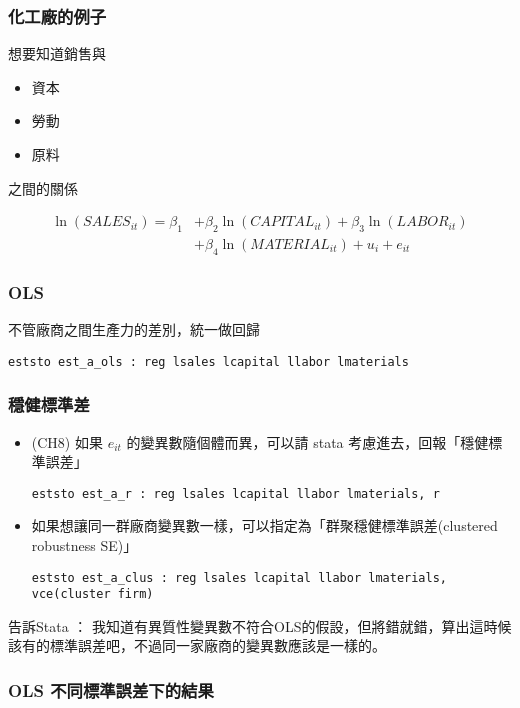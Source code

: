 \begin{frame}
    \frametitle{化工廠的例子}

    想要知道銷售與
    \begin{itemize}
        \item 資本
        \item 勞動
        \item 原料
    \end{itemize}
    之間的關係

    \begin{align*}
        \ln(SALES_{it}) = \beta_1 &+ \beta_2 \ln(CAPITAL_{it})
        + \beta_3 \ln(LABOR_{it}) \\
        & + \beta_4 \ln(MATERIAL_{it}) 
        + u_i + e_{it}
    \end{align*}

\end{frame}

\begin{frame}[fragile]
    \frametitle{OLS}

    不管廠商之間生產力的差別，統一做回歸
    \begin{lstlisting}
eststo est_a_ols : reg lsales lcapital llabor lmaterials \end{lstlisting}
    

\end{frame}

\begin{frame}[fragile]
    \frametitle{穩健標準差}
    \begin{itemize}
        \item 
    (CH8) 如果 $e_{it}$ 的變異數隨個體而異，可以請 stata 考慮進去，回報「穩健標準誤差」
    \begin{lstlisting}
eststo est_a_r : reg lsales lcapital llabor lmaterials, r \end{lstlisting}
        \item  
        如果想讓同一群廠商變異數一樣，可以指定為「群聚穩健標準誤差(clustered robustness SE)」
        \begin{lstlisting}
eststo est_a_clus : reg lsales lcapital llabor lmaterials, vce(cluster firm) \end{lstlisting}
\end{itemize}
    告訴Stata ： 我知道有異質性變異數不符合OLS的假設，但將錯就錯，算出這時候該有的標準誤差吧，不過同一家廠商的變異數應該是一樣的。

\end{frame}

\begin{frame}
    \frametitle{OLS 不同標準誤差下的結果}

    \begin{table}
        
    \end{table}

\end{frame}

